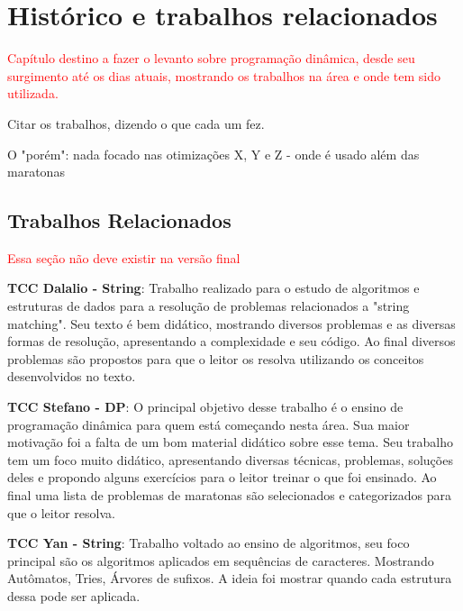 
\chapter{Histórico e trabalhos relacionados}
\label{chap:historico}

\textcolor{red}{Capítulo destino a fazer o levanto sobre programação dinâmica, desde seu surgimento
até os dias atuais, mostrando os trabalhos na área e onde tem sido utilizada.}

Citar os trabalhos, dizendo o que cada um fez.

O "porém": nada focado nas otimizações X, Y e Z
- onde é usado além das maratonas


\section{Trabalhos Relacionados}

\textcolor{red}{Essa seção não deve existir na versão final}


\textbf{TCC Dalalio - String}: Trabalho realizado para o estudo de algoritmos e estruturas de dados para a resolução de problemas relacionados a "string matching". Seu texto é bem didático, mostrando diversos problemas e as diversas formas de resolução, apresentando a complexidade e seu código. Ao final diversos problemas são propostos para que o leitor os resolva utilizando os conceitos desenvolvidos no texto.

\textbf{TCC Stefano - DP}: O principal objetivo desse trabalho é o ensino de programação dinâmica para quem está começando nesta área. Sua maior motivação foi a falta de um bom material didático sobre esse tema. Seu trabalho tem um foco muito didático, apresentando diversas técnicas, problemas, soluções deles e propondo alguns exercícios para o leitor treinar o que foi ensinado. Ao final uma lista de problemas de maratonas são selecionados e categorizados para que o leitor resolva.

\textbf{TCC Yan - String}:  Trabalho voltado ao ensino de algoritmos, seu foco principal são os algoritmos aplicados em sequências de caracteres. Mostrando Autômatos, Tries, Árvores de sufixos. A ideia foi mostrar quando cada estrutura dessa pode ser aplicada.







